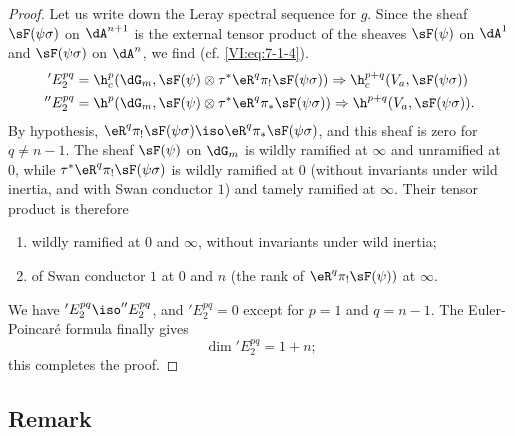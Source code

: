 \begin{proof}[Proof]
Let us write down the Leray spectral sequence for $g$. Since the sheaf $\sF(\psi\sigma)$ on 
$\dA^{n+1}$ is the external tensor product of the sheaves $\sF(\psi)$ on 
$\dA^1$ and $\sF(\psi\sigma)$ on $\dA^n$, we find (cf. \eqref{VI:eq:7-1-4}). 
\begin{align*}
  'E_2^{p q} &= \h_c^p(\dG_m,\sF(\psi)\otimes \tau^\ast \eR^q \pi_! \sF(\psi\sigma)) \Rightarrow \h_c^{p+q}(V_a,\sF(\psi\sigma)) \\
  ''E_2^{p q} &= \h^p(\dG_m,\sF(\psi)\otimes \tau^\ast \eR^q \pi_\ast \sF(\psi\sigma)) \Rightarrow \h^{p+q}(V_a,\sF(\psi\sigma)) \text{.} 
\end{align*}
By hypothesis, 
$\eR^q \pi_! \sF(\psi\sigma) \iso \eR^q \pi_\ast \sF(\psi\sigma)$, and this 
sheaf is zero for $q\ne n-1$. The sheaf $\sF(\psi)$ on $\dG_m$ is 
wildly ramified at $\infty$ and unramified at $0$, while 
$\tau^\ast \eR^q \pi_! \sF(\psi\sigma)$ is wildly ramified at $0$ (without 
invariants under wild inertia, and with Swan conductor $1$) and tamely 
ramified at $\infty$. Their tensor product is therefore 
\begin{enumerate}[\indent a)]
  \item wildly ramified at $0$ and $\infty$, without invariants under wild 
    inertia; 
  \item of Swan conductor $1$ at $0$ and $n$ (the rank of 
    $\eR^q \pi_! \sF(\psi))$ at $\infty$. 
\end{enumerate}
We have $'E_2^{p q} \iso ''E_2^{p q}$, and $'E_2^{p q}=0$ except for $p=1$ and 
$q=n-1$. The Euler-Poincaré formula finally gives 
\[
  \dim{'E_2^{p q}} = 1+n \text{;} 
\]
this completes the proof. 
\end{proof}





\subsection{Remark}\label{VI:7-15}


